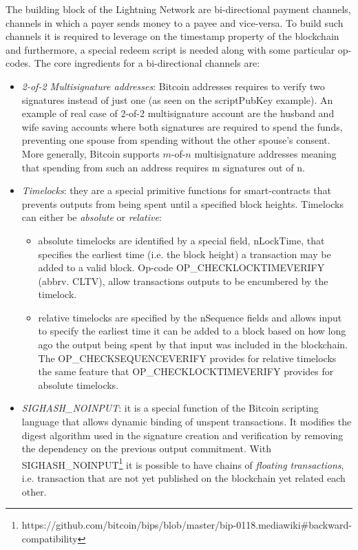 		The building block of the Lightning Network are bi-directional payment channels, channels in which a payer sends money to a payee and vice-versa. To build such channels it is required to leverage on the timestamp property of the blockchain and furthermore, a special redeem script is needed along with some particular op-codes. The core ingredients for a bi-directional channels are:
		\begin{itemize}
			\item \textit{2-of-2 Multisignature addresses}: Bitcoin addresses requires to verify two signatures instead of just one (as seen on the scriptPubKey example). An example of real case of 2-of-2 multisignature account are the husband and wife saving accounts where both signatures are required to spend the funds, preventing one spouse from spending without the other spouse's consent. More generally, Bitcoin supports $m$-of-$n$ multisignature addresses meaning that spending from such an address requires m signatures out of n.
			
			\item \textit{Timelocks}: they are a special primitive functions for smart-contracts that prevents outputs from being spent until a specified block heights. Timelocks can either be \textit{absolute} or \textit{relative}:
			\begin{itemize}
				\item absolute timelocks are identified by a special field, nLockTime, that specifies the earliest time (i.e. the block height) a transaction may be added to a valid block. Op-code OP\_CHECKLOCKTIMEVERIFY \cite{CHECKLOCKTIMEVERIFY} (abbrv. CLTV), allow transactions outputs to be encumbered by the timelock. 
				
				\item relative timelocks are specified by the nSequence fields and allows input to specify the earliest time it can be added to a block based on how long ago the output being spent by that input was included in the blockchain. The OP\_CHECKSEQUENCEVERIFY \cite{CHECKSEQUENCEVERIFY} provides for relative timelocks the same feature that OP\_CHECKLOCKTIMEVERIFY provides for absolute timelocks.
			\end{itemize}	
			
			\item \textit{SIGHASH\_NOINPUT}: it is a special function of the Bitcoin scripting language that allows dynamic binding of unspent transactions. It modifies the digest algorithm used in the signature creation and verification by removing the dependency on the previous output commitment. With SIGHASH\_NOINPUT\footnote{https://github.com/bitcoin/bips/blob/master/bip-0118.mediawiki\#backward-compatibility} it is possible to have chains of \textit{floating transactions}, i.e. transaction that are not yet published on the blockchain yet related each other.
		\end{itemize}
		
